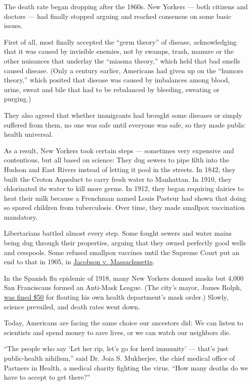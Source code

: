 The death rate began dropping after the 1860s. New Yorkers --- both
citizens and doctors --- had finally stopped arguing and reached
consensus on some basic issues.

First of all, most finally accepted the ``germ theory'' of disease,
acknowledging that it was caused by invisible enemies, not by swamps,
trash, manure or the other nuisances that underlay the ``miasma
theory,'' which held that bad smells caused disease. (Only a century
earlier, Americans had given up on the ``humors theory,'' which posited
that disease was caused by imbalances among blood, urine, sweat and bile
that had to be rebalanced by bleeding, sweating or purging.)

They also agreed that whether immigrants had brought some diseases or
simply suffered from them, no one was safe until everyone was safe, so
they made public health universal.

As a result, New Yorkers took certain steps --- sometimes very expensive
and contentious, but all based on science: They dug sewers to pipe filth
into the Hudson and East Rivers instead of letting it pool in the
streets. In 1842, they built the Croton Aqueduct to carry fresh water to
Manhattan. In 1910, they chlorinated its water to kill more germs. In
1912, they began requiring dairies to heat their milk because a
Frenchman named Louis Pasteur had shown that doing so spared children
from tuberculosis. Over time, they made smallpox vaccination mandatory.

Libertarians battled almost every step. Some fought sewers and water
mains being dug through their properties, arguing that they owned
perfectly good wells and cesspools. Some refused smallpox vaccines until
the Supreme Court put an end to that in 1905, in
\href{https://www.nytimes3xbfgragh.onion/2019/04/09/health/measles-outbreak-vaccinations-brooklyn.html}{Jacobson
v. Massachusetts}.

In the Spanish flu epidemic of 1918, many New Yorkers donned masks but
4,000 San Franciscans formed an Anti-Mask League. (The city's mayor,
James Rolph,
\href{https://www.kqed.org/arts/13878268/mindblowing-tales-from-san-franciscos-long-history-with-epidemics}{was
fined \$50} for flouting his own health department's mask order.)
Slowly, science prevailed, and death rates went down.

Today, Americans are facing the same choice our ancestors did: We can
listen to scientists and spend money to save lives, or we can watch our
neighbors die.

``The people who say `Let her rip, let's go for herd immunity' ---
that's just public-health nihilism,'' said Dr. Joia S. Mukherjee, the
chief medical office of Partners in Health, a medical charity fighting
the virus. ``How many deaths do we have to accept to get there?''

